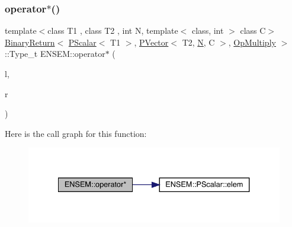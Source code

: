 \subsubsection{\texorpdfstring{operator$\ast$()}{operator*()}\hspace{0.1cm}{\footnotesize\ttfamily [2/3]}}
{\footnotesize\ttfamily template$<$class T1 , class T2 , int N, template$<$ class, int $>$ class C$>$ \\
\mbox{\hyperlink{structENSEM_1_1BinaryReturn}{Binary\+Return}}$<$ \mbox{\hyperlink{classENSEM_1_1PScalar}{P\+Scalar}}$<$ T1 $>$, \mbox{\hyperlink{classENSEM_1_1PVector}{P\+Vector}}$<$ T2, \mbox{\hyperlink{operator__name__util_8cc_a7722c8ecbb62d99aee7ce68b1752f337}{N}}, C $>$, \mbox{\hyperlink{structENSEM_1_1OpMultiply}{Op\+Multiply}} $>$\+::Type\+\_\+t E\+N\+S\+E\+M\+::operator$\ast$ (\begin{DoxyParamCaption}\item[{const \mbox{\hyperlink{classENSEM_1_1PScalar}{P\+Scalar}}$<$ T1 $>$ \&}]{l,  }\item[{const \mbox{\hyperlink{classENSEM_1_1PVector}{P\+Vector}}$<$ T2, \mbox{\hyperlink{operator__name__util_8cc_a7722c8ecbb62d99aee7ce68b1752f337}{N}}, C $>$ \&}]{r }\end{DoxyParamCaption})\hspace{0.3cm}{\ttfamily [inline]}}

Here is the call graph for this function\+:\nopagebreak
\begin{figure}[H]
\begin{center}
\leavevmode
\includegraphics[width=334pt]{d3/dc4/group__primvector_ga8312ce5cc507ffa0b4b203b976d05f47_cgraph}
\end{center}
\end{figure}
\mbox{\label{group__primvector_gabc873d4c0d9c1d0ff8638e1674f29a72}} 
